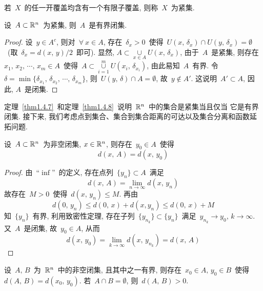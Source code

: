 \begin{definition}
若~$X$~的任一开覆盖均含有一个有限子覆盖, 则称~$X$~为紧集.
\end{definition}

\begin{theorem} \label{thm1.4.8}
设~$A \subset \mathbb{R}^n$~为紧集, 则~$A$~是有界闭集.
\end{theorem}

\begin{proof}
设~$y \in A^c$, 则对~$\forall~ x \in A$, 存在~$\delta_x > 0$~使得~$U(x,\,\delta_x) \cap U(y,\,\delta_x) = \emptyset$~(取~$\delta_x = d(x,\,y)/2$~即可). 显然, $A \subset \mathop{\cup}\limits_{x \in A} U(x,\,\delta_x)$, 由于~$A$~是紧集, 则存在~$x_1,\,x_2,\,\cdots,\,x_m \in A$~使得~$A \subset \mathop{\cup}\limits_{i=1} ^m U(x_i,\,\delta_{x_i})$, 由此易知~$A$~有界. 令~$\delta = \min\{\delta_{x_1},\,\delta_{x_2},\,\cdots,\,\delta_{x_m}\}$, 则~$U(y,\,\delta) \cap A = \emptyset$, 故~$y \notin A'$. 这说明~$A' \subset A$, 因此, $A$~是闭集.
\end{proof}

定理~\ref{thm1.4.7}~和定理~\ref{thm1.4.8}~说明~$\mathbb{R}^n$~中的集合是紧集当且仅当
它是有界闭集. 接下来, 我们考虑点到集合、集合到集合距离的可达以及集合分离和函数延拓问题.

\begin{theorem}
设~$A \subset \mathbb{R}^n$~为非空闭集, $x \in \mathbb{R}^n$, 则存在~$y_0 \in A$~使得
\[
d(x,\,A) = d(x,\,y_0)
\]
\end{theorem}

\begin{proof}
由~``$\inf$''~的定义, 存在点列~$\{y_n\} \subset A$~满足
\[
d(x,\,A) = \lim_{n \to \infty} d(x,\,y_n)
\]
故存在~$M > 0$~使得~$d(x,\,y_n) \leqslant M$. 再由
\[
d(0, \, y_n) \leqslant d(0, \, x) + d(x, y_n) \leqslant d(0, \, x) + M
\]
知~$\{y_n\}$~有界, 利用致密性定理, 存在子列~$\{y_{n_k}\} \subset \{y_n\}$~满足~$y_{n_k} \rightarrow y_0, \, k \to \infty$. 又~$A$~是闭集, 故~$y_0 \in A$, 从而
\[
d(x,\,y_0) = \lim_{k \to \infty} d(x,\,y_{n_k}) = d(x,\,A)
\]
\end{proof}

\begin{theorem} \label{thm1.4.9}
设~$A,\,B$~为~$\mathbb{R}^n$~中的非空闭集, 且其中之一有界, 则存在~$x_0 \in A, \, y_0 \in B$~使得~$d(A,\,B) = d(x_0,\,y_0)$. 若~$A \cap B = \emptyset$, 则~$d(A,\,B) > 0$.
\end{theorem}

